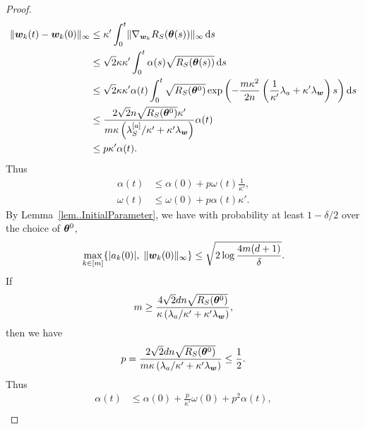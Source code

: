\documentclass[twoside,11pt]{article}
\begin{document}
\begin{proof}
\begin{equation*}
        \begin{aligned}
            \lVert\bm{w}_k(t) - \bm{w}_k(0)\rVert_{\infty}
             & \leq \kappa'\int_{0}^{t} \lVert\nabla_{\bm{w}_k}R_S(\bm{\theta}(s))\rVert_{\infty}\mathop{}\!\mathrm{d}{s}                                                                                                     \\
             & \leq \sqrt{2}\kappa\kappa' \int_{0}^t \alpha(s)\sqrt{R_S(\bm{\theta}(s))} \mathop{}\!\mathrm{d}{s}                                                                                                     \\
             & \leq \sqrt{2}\kappa\kappa' \alpha(t) \int_{0}^{t} \sqrt{R_S(\bm{\theta}^0)}\exp\left(-\frac{m\kappa^2}{2n}\left(\frac{1}{\kappa'}\lambda_a+\kappa'\lambda_{\bm{w}}\right)s\right)\mathop{}\!\mathrm{d}{s} \\
             & \leq \frac{2\sqrt{2}n\sqrt{R_S(\bm{\theta}^0)}\kappa'}{m\kappa\left(\lambda^{[a]}_S/\kappa'+\kappa'\lambda_{\bm{w}}\right)}\alpha(t)                                                      \\
             & \leq p\kappa'\alpha(t).
        \end{aligned}
    \end{equation*}
    Thus
    \begin{equation*}
        \begin{aligned}
            \alpha(t) & \leq\alpha(0)+p\omega(t)\frac{1}{\kappa'}, \\
            \omega(t) & \leq\omega(0)+p\alpha(t)\kappa'.
        \end{aligned}
    \end{equation*}
    By Lemma~\ref{lem..InitialParameter}, we have with probability at least $1 - \delta/2$ over the choice of $\bm{\theta}^0$,
    \begin{equation*}
        \max\limits_{k\in[m]}\{\lvert a_k(0)\rvert,\;\lVert\bm{w}_k(0)\rVert_{\infty}\}\leq \sqrt{2\log\frac{4m(d+1)}{\delta}}.
    \end{equation*}
    If
    \begin{equation*}
        m \geq \frac{4\sqrt{2}dn\sqrt{R_S(\bm{\theta}^0)}}{\kappa\left(\lambda_a/\kappa'+\kappa'\lambda_{\bm{w}}\right)},
    \end{equation*}
    then we have
    \begin{equation*}
        p=\frac{2\sqrt{2}dn\sqrt{R_S(\bm{\theta}^0)}}{m\kappa\left(\lambda_a/\kappa'+\kappa'\lambda_{\bm{w}}\right)}\leq \frac{1}{2}.
    \end{equation*}
    Thus
    \begin{align*}
        \alpha(t) & \leq\alpha(0)+\frac{p}{\kappa'}\omega(0)+p^2\alpha(t),          \\

\end{align*}
\end{proof}
\end{document}
